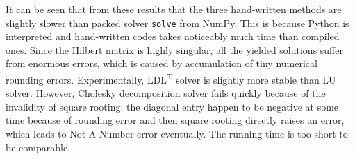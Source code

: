 \documentclass[english, nochinese]{pnote}
\begin{document}
It can be seen that from these results that the three hand-written methods are slightly slower than packed solver \verb"solve" from NumPy. This is because Python is interpreted and hand-written codes takes noticeably much time than compiled ones. Since the Hilbert matrix is highly singular, all the yielded solutions suffer from enormous errors, which is caused by accumulation of tiny numerical rounding errors. Experimentally, LDL\textsuperscript{T} solver is slightly more stable than LU solver. However, Cholesky decomposition solver fails quickly because of the invalidity of square rooting: the diagonal entry happen to be negative at some time because of rounding error and then square rooting directly raises an error, which leads to Not A Number error eventually. The running time is too short to be comparable.
\end{document}
